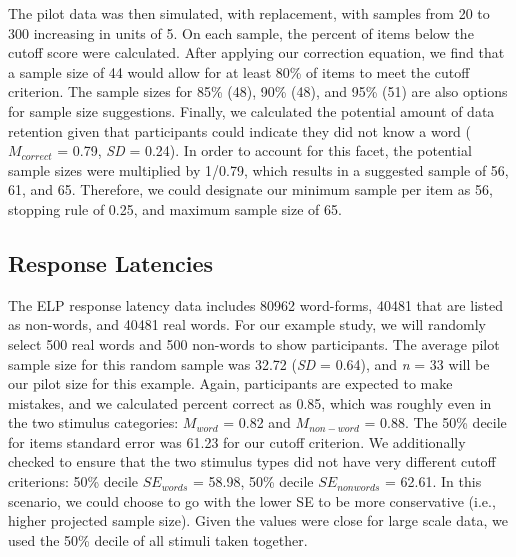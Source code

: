 \documentclass[
  man]{apa6}
\begin{document}
The pilot data was then simulated, with replacement, with samples from 20 to 300 increasing in units of 5. On each sample, the percent of items below the cutoff score were calculated. After applying our correction equation, we find that a sample size of 44 would allow for at least 80\% of items to meet the cutoff criterion. The sample sizes for 85\% (48), 90\% (48), and 95\% (51) are also options for sample size suggestions. Finally, we calculated the potential amount of data retention given that participants could indicate they did not know a word (\(M_{correct}\) = 0.79, \emph{SD} = 0.24). In order to account for this facet, the potential sample sizes were multiplied by 1/0.79, which results in a suggested sample of 56, 61, and 65. Therefore, we could designate our minimum sample per item as 56, stopping rule of 0.25, and maximum sample size of 65.

\hypertarget{response-latencies}{%
\subsection{Response Latencies}\label{response-latencies}}

The ELP response latency data includes 80962 word-forms, 40481 that are listed as non-words, and 40481 real words. For our example study, we will randomly select 500 real words and 500 non-words to show participants. The average pilot sample size for this random sample was 32.72 (\emph{SD} = 0.64), and \emph{n} = 33 will be our pilot size for this example. Again, participants are expected to make mistakes, and we calculated percent correct as 0.85, which was roughly even in the two stimulus categories: \(M_{word}\) = 0.82 and \(M_{non-word}\) = 0.88. The 50\% decile for items standard error was 61.23 for our cutoff criterion. We additionally checked to ensure that the two stimulus types did not have very different cutoff criterions: 50\% decile \(SE_{words}\) = 58.98, 50\% decile \(SE_{nonwords}\) = 62.61. In this scenario, we could choose to go with the lower SE to be more conservative (i.e., higher projected sample size). Given the values were close for large scale data, we used the 50\% decile of all stimuli taken together.
\end{document}
